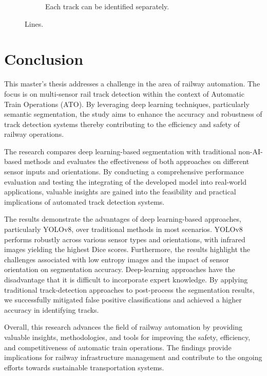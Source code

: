 \documentclass[Master,MDS,english]{BASE/twbook} %
\begin{document}
\begin{figure}
\begin{subfigure}[t]{.215\textwidth}
  \caption{Each track can be identified separately. }
\end{subfigure}
\caption{Lines. }
\label{fig:postprocessing2}
\end{figure}





\chapter{Conclusion} %

This master's thesis addresses a challenge in the area of railway automation. The focus is on multi-sensor rail track detection within the context of Automatic Train Operations (ATO). By leveraging deep learning techniques, particularly semantic segmentation, the study aims to enhance the accuracy and robustness of track detection systems thereby contributing to the efficiency and safety of railway operations.

The research compares deep learning-based segmentation with traditional non-AI-based methods and evaluates the effectiveness of both approaches on different sensor inputs and orientations. By conducting a comprehensive performance evaluation and testing the integrating of the developed model into real-world applications, valuable insights are gained into the feasibility and practical implications of automated track detection systems.

The results demonstrate the advantages of deep learning-based approaches, particularly YOLOv8, over traditional methods in most scenarios. YOLOv8 performs robustly across various sensor types and orientations, with infrared images yielding the highest Dice scores. Furthermore, the results highlight the challenges associated with low entropy images and the impact of sensor orientation on segmentation accuracy. 
Deep-learning approaches have the disadvantage that it is difficult to incorporate expert knowledge. By applying traditional track-detection approaches to post-process the segmentation results, we successfully mitigated false positive classifications and achieved a higher accuracy in identifying tracks.

Overall, this research advances the field of railway automation by providing valuable insights, methodologies, and tools for improving the safety, efficiency, and competitiveness of automatic train operations. The findings provide implications for railway infrastructure management and contribute to the ongoing efforts towards sustainable transportation systems.
\end{document}
